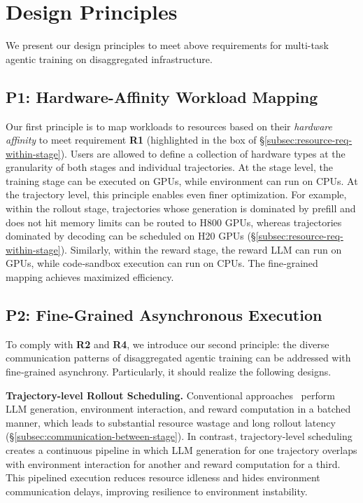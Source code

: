 \section{Design Principles}
\label{sec:design-principle}
We present our design principles to meet above requirements for multi-task agentic training on disaggregated infrastructure.


\subsection{P1: Hardware-Affinity Workload Mapping}
Our first principle is to map workloads to resources based on their \textit{hardware affinity} to meet requirement \textbf{R1} (highlighted in the box of \S\ref{subsec:resource-req-within-stage}). Users are allowed to define a collection of hardware types at the granularity of both stages and individual trajectories. At the stage level, the training stage can be executed on GPUs, while environment can run on CPUs. At the trajectory level, this principle enables even finer optimization. For example, within the rollout stage, trajectories whose generation is dominated by prefill and does not hit memory limits can be routed to H800 GPUs, whereas trajectories dominated by decoding can be scheduled on H20 GPUs (\S\ref{subsec:resource-req-within-stage}). Similarly, within the reward stage, the reward LLM can run on GPUs, while code‑sandbox execution can run on CPUs. The fine‑grained mapping achieves maximized efficiency.





\subsection{P2: Fine-Grained Asynchronous Execution}
To comply with \textbf{R2} and \textbf{R4}, we introduce our second principle: the diverse communication patterns of disaggregated agentic training can be addressed with fine‑grained asynchrony. Particularly, it should realize the following designs. 

\noindent\textbf{Trajectory-level Rollout Scheduling.} Conventional approaches~\cite{verl} perform LLM generation, environment interaction, and reward computation in a batched manner, which leads to substantial resource wastage and long rollout latency (\S\ref{subsec:communication-between-stage}). In contrast, trajectory-level scheduling creates a continuous pipeline in which LLM generation for one trajectory overlaps with environment interaction for another and reward computation for a third. This pipelined execution reduces resource idleness and hides environment communication delays, improving resilience to environment instability.



